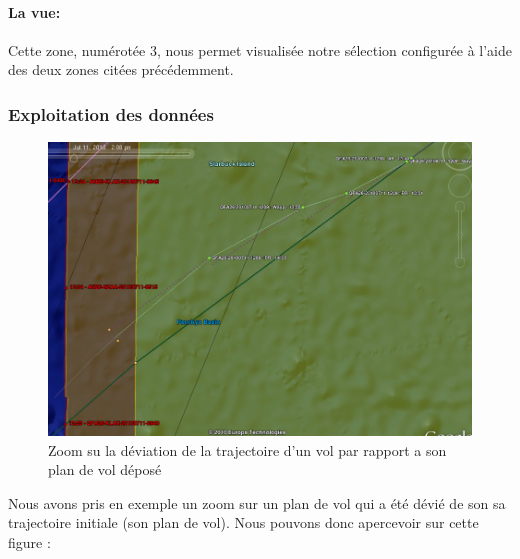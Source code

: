             \paragraph{La vue:}
Cette zone, numérotée 3, nous permet visualisée notre sélection configurée à l'aide des deux zones citées précédemment.

        \subsubsection{Exploitation des données}
\begin{figure}[!h]
\center
\includegraphics[width=12cm]{images/gezoom.png}
\caption{Zoom su la déviation de la trajectoire d'un vol par rapport a son plan de vol déposé}
\label{gezoom}
\end{figure}
Nous avons pris en exemple un zoom sur un plan de vol qui a été dévié de son sa trajectoire initiale (son plan de vol).
Nous pouvons donc apercevoir sur cette figure :
